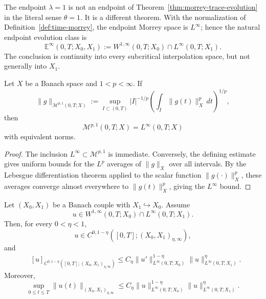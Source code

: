\documentclass[smallextended,envcountsect,envcountsame]{svjour3}
\begin{document}
	The endpoint $\lambda=1$ is not an endpoint of Theorem~\ref{thm:morrey-trace-evolution} in the literal sense $\theta=1$. It is a different theorem. With the normalization of Definition~\ref{def:time-morrey}, the endpoint Morrey space is $L^\infty$; hence the natural endpoint evolution class is
	\[
	\mathbb E^\infty(0,T;X_0,X_1)
	:=
	W^{1,\infty}(0,T;X_0)\cap L^\infty(0,T;X_1).
	\]
	The conclusion is continuity into every subcritical interpolation space, but not generally into $X_1$.

	\begin{lemma}\label{lem:morrey-endpoint-linfty}
	Let $X$ be a Banach space and $1<p<\infty$. If
	\[
	\|g\|_{\mathcal M^{p,1}(0,T;X)}
	:=
	\sup_{I\subset(0,T)} |I|^{-1/p}
	\left(\int_I\|g(t)\|_X^p\,dt\right)^{1/p},
	\]
	then
	\[
	\mathcal M^{p,1}(0,T;X)=L^\infty(0,T;X)
	\]
	with equivalent norms.
	\end{lemma}

	\begin{proof}
	The inclusion $L^\infty\subset\mathcal M^{p,1}$ is immediate. Conversely, the defining estimate gives uniform bounds for the $L^p$ averages of $\|g\|_X$ over all intervals. By the Lebesgue differentiation theorem applied to the scalar function $\|g(\cdot)\|_X^p$, these averages converge almost everywhere to $\|g(t)\|_X^p$, giving the $L^\infty$ bound.
	\end{proof}

	\begin{theorem}\label{thm:endpoint-subcritical-trace}
	Let $(X_0,X_1)$ be a Banach couple with $X_1\hookrightarrow X_0$. Assume
	\[
	u\in W^{1,\infty}(0,T;X_0)\cap L^\infty(0,T;X_1).
	\]
	Then, for every $0<\eta<1$,
	\[
	u\in C^{0,1-\eta}([0,T];(X_0,X_1)_{\eta,\infty}),
	\]
	and
	\begin{align*}
	&[u]_{C^{0,1-\eta}([0,T];(X_0,X_1)_{\eta,\infty})}
	\le
	C_\eta
	\|u'\|_{L^\infty(0,T;X_0)}^{1-\eta}
	\|u\|_{L^\infty(0,T;X_1)}^{\eta}.
	\end{align*}
	Moreover,
	\[
	\sup_{0\le t\le T}\|u(t)\|_{(X_0,X_1)_{\eta,\infty}}
	\le
	C_\eta
	\|u\|_{L^\infty(0,T;X_0)}^{1-\eta}
	\|u\|_{L^\infty(0,T;X_1)}^\eta.
	\]
	\end{theorem}
\end{document}
